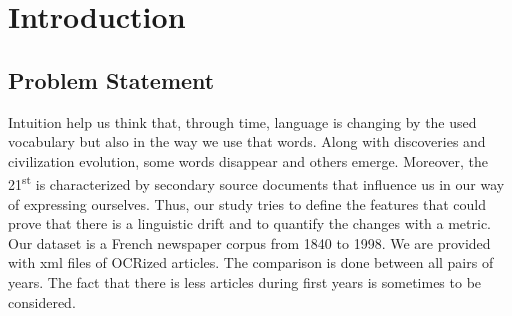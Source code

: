 \section{Introduction}

\subsection{Problem Statement}
Intuition help us think that, through time, language is changing by the used vocabulary but also in the way we use that words.
Along with discoveries and civilization evolution, some words disappear and others emerge. Moreover, the 21\textsuperscript{st} is characterized by secondary source documents that influence us in our way of expressing ourselves. Thus, our study tries to define the features that could prove that there is a linguistic drift and to quantify the changes with a metric.
Our dataset is a French newspaper corpus from 1840 to 1998. We are provided with xml files of OCRized articles. The comparison is done between all pairs of years. The fact that there is less articles during first years is sometimes to be considered.

